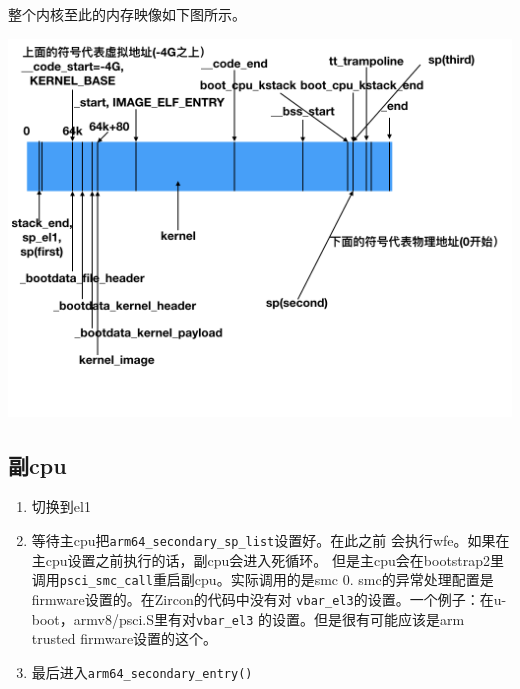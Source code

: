 整个内核至此的内存映像如下图所示。

\includegraphics[scale=0.45]{zircon.png}

\subsection{副cpu}
\begin{enumerate}
    \item 切换到el1
    \item 等待主cpu把\verb!arm64_secondary_sp_list!设置好。在此之前
          会执行wfe。如果在主cpu设置之前执行的话，副cpu会进入死循环。
          但是主cpu会在bootstrap2里调用\verb!psci_smc_call!重启副cpu。实际调用的是smc 0.
          smc的异常处理配置是firmware设置的。在Zircon的代码中没有对
          \verb|vbar_el3|的设置。一个例子：在u-boot，armv8/psci.S里有对\verb|vbar_el3|
          的设置。但是很有可能应该是arm trusted firmware设置的这个。
    \item 最后进入\verb!arm64_secondary_entry()!
\end{enumerate}

